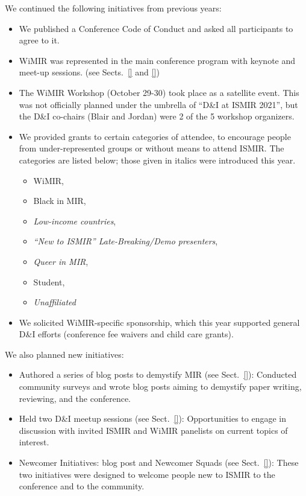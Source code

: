 \documentclass[%
10pt,								%
]
{scrartcl}
\begin{document}
        We continued the following initiatives from previous years:
        \begin{itemize}
            \item   We published a Conference Code of Conduct and asked all participants to agree to it.
            \item   WiMIR was represented in the main conference program with keynote and meet-up sessions. (see Sects.~\ref{} and \ref{})
            \item   The WiMIR Workshop (October 29-30) took place as a satellite event. This was not officially planned under the umbrella of “D\&I at ISMIR 2021”, but the D\&I co-chairs (Blair and Jordan) were 2 of the 5 workshop organizers.
            \item   We provided grants to certain categories of attendee, to encourage people from under-represented groups or without means to attend ISMIR. The categories are listed below; those given in italics were introduced this year.
                \begin{itemize}
                    \item   WiMIR,
                    \item   Black in MIR,
                    \item   \textit{Low-income countries},
                    \item   \textit{``New to ISMIR'' Late-Breaking/Demo presenters},
                    \item   \textit{Queer in MIR},
                    \item   Student,
                    \item   \textit{Unaffiliated}
                \end{itemize}
            \item   We solicited WiMIR-specific sponsorship, which this year supported general D\&I efforts (conference fee waivers and child care grants).
        \end{itemize}

        We also planned new initiatives:
        \begin{itemize}
            \item   Authored a series of blog posts to demystify MIR (see Sect.~\ref{}):
               Conducted community surveys and wrote blog posts aiming to demystify paper writing, reviewing, and the conference.
            \item   Held two D\&I meetup sessions (see Sect.~\ref{}):
               Opportunities to engage in discussion with invited ISMIR and WiMIR panelists on current topics of interest. 
            \item   Newcomer Initiatives: blog post and Newcomer Squads (see Sect.~\ref{}):
               These two initiatives were designed to welcome people new to ISMIR to the conference and to the community.
        \end{itemize}
\end{document}

